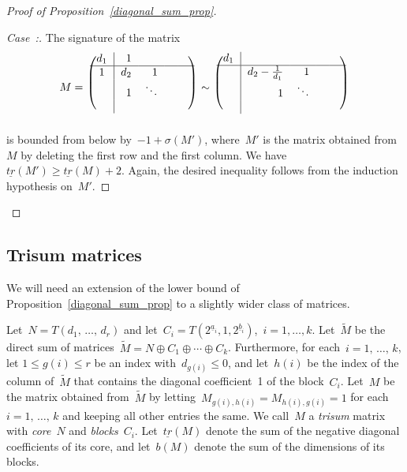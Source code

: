 \documentclass[AHL,Unicode,longabstracts,published]{cedram}
\newcounter{casecount}
\newenvironment{case}[1]{\refstepcounter{casecount}\begin{proof}[Case~\thecasecount:\;{#1}]}{\let\qed\relax\end{proof}}
\begin{document}
\begin{proof}[Proof of Proposition~\ref{diagonal_sum_prop}]
\begin{case}{{$d_1 \le -2$}}
The signature of the matrix
\begin{gather*}
M =\
\begin{blockarray}{crrrrc}
\begin{block}{(c|rrrrc)}
d_1 & 1 & \ & \ & \ \\ \BAhhline{-------------~} 1 & d_2 & 1 & \ & \ \\
\ & 1 & \ddots & & \\
\ & \ & & & \\
\end{block}
\end{blockarray}\
\sim\
\begin{blockarray}{crrrrc}
\begin{block}{(c|rrrrc)}
d_1 & & \ & \ & \ \\ \BAhhline{-------------~} & d_2-\frac{1}{d_1} & 1 & \ & \ \\
\ & 1 & \ddots & & \\
\ & \ & & & \\
\end{block}
\end{blockarray}\
\end{gather*}
is bounded from below by~$-1+\sigma(M')$, where~$M'$ is the matrix obtained from~$M$ by deleting the first row and the first column. We have~$\underline{tr}(M') \ge \underline{tr}(M)+2.$ Again, the desired inequality follows from the induction hypothesis on~$M'$.
\end{case}
\end{proof}

\subsection{Trisum matrices}

We will need an extension of the lower bound of Proposition~\ref{diagonal_sum_prop} to a slightly wider class of matrices.

Let~$N = T(d_1,\,\dots,\,d_r)$ and let~$C_i = T(2^{\underline a_i},1,2^{\underline b_i})$,~$i=1,\dots,k$. Let~$\widetilde M$ be the direct sum of matrices~$\widetilde M=N\oplus C_1 \oplus \cdots \oplus C_k$. Furthermore, for each~$i=1,\,\dots,\,k$, let $1 \le g(i) \le r$ be an index with~$d_{g(i)} \le 0$, and let~$h(i)$ be the index of the column of~$\widetilde M$ that contains the diagonal coefficient~1 of the block~$C_i$. Let~$M$ be the matrix obtained from~$\widetilde M$ by letting~$M_{g(i),h(i)} = M_{h(i),g(i)} = 1$ for each~$i=1,\,\dots,\,k$ and keeping all other entries the same. We call~$M$ a \emph{trisum} matrix with \emph{core}~$N$ and \emph{blocks}~$C_i$. Let~$\underline{tr}(M)$ denote the sum of the negative diagonal coefficients of its core, and let~$b(M)$ denote the sum of the dimensions of its blocks.
\end{document}
